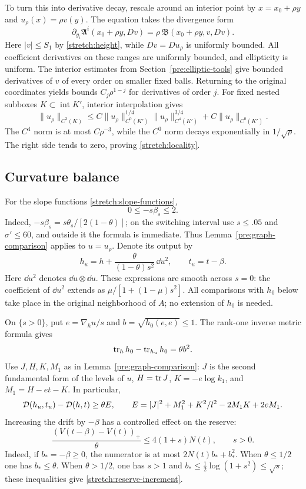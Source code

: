 To turn this into derivative decay, rescale around an interior point by
$x=x_0+\rho y$ and $u_\rho(x)=\rho v(y)$.  The equation takes the
divergence form
\[
 \partial_{y_i}\mathfrak A^i(x_0+\rho y,Dv)
           =\rho\,\mathfrak B(x_0+\rho y,v,Dv).
\]
Here $|v|\le S_1$ by \eqref{stretch:height}, while $Dv=Du_\rho$ is
uniformly bounded.  All coefficient derivatives on these ranges are
uniformly bounded, and ellipticity is uniform.  The interior estimates
from Section~\ref{pre:elliptic-tools} give bounded derivatives of $v$
of every order on smaller fixed balls.  Returning to the original
coordinates yields bounds $C_j\rho^{1-j}$ for derivatives of order $j$.
For fixed nested subboxes $K\subset\operatorname{int}K'$, interior
interpolation gives
\[
 \|u_\rho\|_{C^3(K)}
 \le C\|u_\rho\|_{C^0(K')}^{1/4}
          \|u_\rho\|_{C^4(K')}^{3/4}
       +C\|u_\rho\|_{C^0(K')}.
\]
The $C^4$ norm is at most $C\rho^{-3}$, while the $C^0$ norm decays
exponentially in $1/\sqrt\rho$.  The right side tends to zero, proving
\eqref{stretch:locality}.

\subsection{Curvature balance}
\label{stretch:curvature}

For the slope functions \eqref{stretch:slope-functions},
\[
 0\le-s\beta_s\le2.
\]
Indeed, $-s\beta_s=s\theta_s/[2(1-\theta)]$; on the switching interval
use $s\le.05$ and $\sigma'\le60$, and outside it the formula is immediate.
Thus Lemma~\ref{pre:graph-comparison} applies to $u=u_\rho$.  Denote its
output by
\begin{equation}\label{stretch:raw-data}
 h_u=h+\frac{\theta}{(1-\theta)s^2}\,\dd u^2,
                 \qquad t_u=t-\beta.
\end{equation}
Here $\dd u^2$ denotes $\dd u\otimes\dd u$.
These expressions are smooth across $s=0$: the coefficient of $\dd u^2$
extends as $\mu/[1+(1-\mu)s^2]$.  All comparisons with $h_0$ below take
place in the original neighborhood of $A$; no extension of $h_0$ is
needed.

On $\{s>0\}$, put $e=\nabla_hu/s$ and $b=\sqrt{h_0(e,e)}\le1$.
The rank-one inverse metric formula gives
\begin{equation}\label{stretch:trace}
 \operatorname{tr}_hh_0-\operatorname{tr}_{h_u}h_0=\theta b^2.
\end{equation}
Use $J,H,K,M_1$ as in Lemma~\ref{pre:graph-comparison}: $J$ is the
second fundamental form of the levels of $u$, $H=\operatorname{tr} J$,
$K=-e\log k_1$, and $M_1=H-et-K$.  In particular,
\[
 \mathcal D(h_u,t_u)-\mathcal D(h,t)\ge\theta E,\qquad
 E=|J|^2+M_1^2+K^2/l^2-2M_1K+2eM_1.
\]
Increasing the drift by $-\beta$ has a controlled effect on the reserve:
\begin{equation}\label{stretch:reserve-increment}
 \frac{(V(t-\beta)-V(t))_+}{\theta}
       \le4(1+s)N(t),\qquad s>0.
\end{equation}
Indeed, if $b_*=-\beta\ge0$, the numerator is at most
$2N(t)b_*+b_*^2$.  When $\theta\le1/2$ one has $b_*\le\theta$.
When $\theta>1/2$, one has $s>1$ and
$b_*\le\tfrac12\log(1+s^2)\le\sqrt s$; these inequalities give
\eqref{stretch:reserve-increment}.

